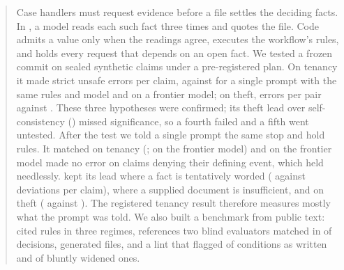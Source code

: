 \begin{abstract}
Case handlers must request evidence before a file settles the deciding facts. In \casepath, a model reads each such fact three times and quotes the file. Code admits a value only when the readings agree, executes the workflow's rules, and holds every request that depends on an open fact. We tested a frozen commit on sealed synthetic claims under a pre-registered plan. On tenancy it made \sthreeHTwoA{} strict unsafe errors per claim, against \sthreeHTwoB{} for a single prompt with the same rules and model and \sthreeHThreeB{} on a frontier model; on theft, \sthreeHOneA{} errors per pair against \sthreeHOneB. These three hypotheses were confirmed; its theft lead over self-consistency (\sthreeHFourSCB) missed significance, so a fourth failed and a fifth went untested. After the test we told a single prompt the same stop and hold rules. It matched \casepath on tenancy (\sbcHoldPromptAllStrict; \sbcHoldPromptFrontierAllStrict{} on the frontier model) and on the frontier model made no error on claims denying their defining event, which \casepath held needlessly. \casepath kept its lead where a fact is tentatively worded (\sbcCasePathOpenBranchAllDev{} against \sbcHoldPromptOpenBranchAllDev{} deviations per claim), where a supplied document is insufficient, and on theft (\sthreeHOneA{} against \sbcHoldPromptThErrors). The registered tenancy result therefore measures mostly what the prompt was told. We also built a benchmark from public text: \sfourdevAllRules{} cited rules in three regimes, references two blind evaluators matched in \sfourdevCleanroomSame{} of \sfourdevCleanroomDocuments{} decisions, \sfourdevAllFiles{} generated files, and a lint that flagged \sfourdevLintUntouchedFlagged{} of \sfourdevLintUntouched{} conditions as written and \sfourdevLintBluntDetected{} of \sfourdevLintBluntPlanted{} bluntly widened ones.
\end{abstract}
